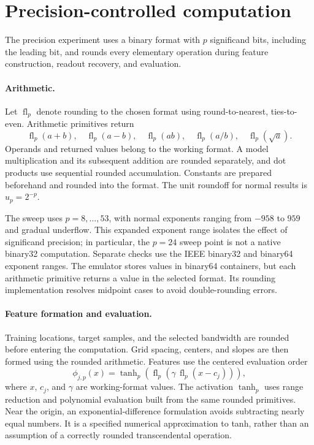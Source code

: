 \section{Precision-controlled computation}
\label{app:pbit-solver}

The precision experiment uses a binary format with $p$ significand bits,
including the leading bit, and rounds every elementary operation during
feature construction, readout recovery, and evaluation.

\paragraph{Arithmetic.}
Let $\operatorname{fl}_p$ denote rounding to the chosen format using
round-to-nearest, ties-to-even. Arithmetic primitives return
\[
\operatorname{fl}_p(a+b),\quad
\operatorname{fl}_p(a-b),\quad
\operatorname{fl}_p(ab),\quad
\operatorname{fl}_p(a/b),\quad
\operatorname{fl}_p(\sqrt{a}).
\]
Operands and returned values belong to the working format.
A model multiplication and its subsequent addition are rounded
separately, and dot products use sequential rounded accumulation.
Constants are prepared beforehand and rounded into the format.
The unit roundoff for normal results is $u_p=2^{-p}$.

The sweep uses $p=8,\ldots,53$, with normal exponents ranging from
$-958$ to $959$ and gradual underflow. This expanded exponent range
isolates the effect of significand precision; in particular, the
$p=24$ sweep point is not a native binary32 computation. Separate
checks use the IEEE binary32 and binary64 exponent ranges.
The emulator stores values in binary64 containers, but each arithmetic
primitive returns a value in the selected format. Its rounding
implementation resolves midpoint cases to avoid double-rounding errors.

\paragraph{Feature formation and evaluation.}
Training locations, target samples, and the selected bandwidth are
rounded before entering the computation. Grid spacing, centers, and
slopes are then formed using the rounded arithmetic. Features use
the centered evaluation order
\[
\phi_{j,p}(x)
=
\tanh_p\!\left(
  \operatorname{fl}_p\!\left(
    \gamma\,\operatorname{fl}_p(x-c_j)
  \right)
\right),
\]
where $x$, $c_j$, and $\gamma$ are working-format values.
The activation $\tanh_p$ uses range reduction and polynomial
evaluation built from the same rounded primitives. Near the origin,
an exponential-difference formulation avoids subtracting nearly equal
numbers. It is a specified numerical approximation to tanh, rather
than an assumption of a correctly rounded transcendental operation.

